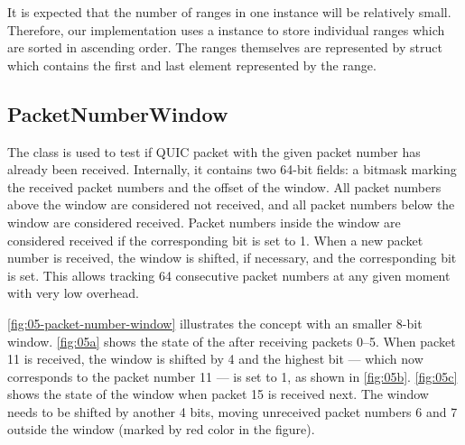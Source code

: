 It is expected that the number of ranges in one \RangeSet{} instance will be relatively small.
Therefore, our implementation uses a  instance to store individual ranges which
are sorted in ascending order. The ranges themselves are represented by
 struct which contains the first and last element represented by
the range.

\subsection{PacketNumberWindow}

The \PacketNumberWindow{} class is used to test if QUIC packet with the given packet number has
already been received. Internally, it contains two 64-bit  fields: a bitmask marking
the received packet numbers and the offset of the window. All packet numbers above the window are
considered not received, and all packet numbers below the window are considered received. Packet
numbers inside the window are considered received if the corresponding bit is set to 1. When a new
packet number is received, the window is shifted, if necessary, and the corresponding bit is set.
This allows tracking 64 consecutive packet numbers at any given moment with very low overhead.

\autoref{fig:05-packet-number-window} illustrates the concept with an smaller 8-bit window.
\autoref{fig:05a} shows the state of the \PacketNumberWindow{} after receiving packets 0--5. When
packet 11 is received, the window is shifted by 4 and the highest bit --- which now corresponds to the
packet number 11 --- is set to 1, as shown in \autoref{fig:05b}. \autoref{fig:05c} shows the state of
the window when packet 15 is received next. The window needs to be shifted by another 4 bits, moving
unreceived packet numbers 6 and 7 outside the window (marked by red color in the figure).

\newlength{\origframesep}
\setlength{\fboxsep}{0.12em}


